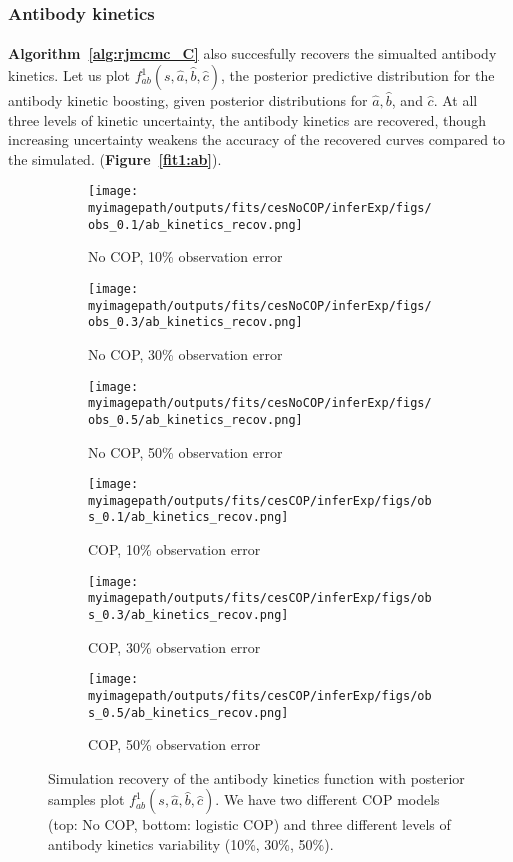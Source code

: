 \subsubsection{Antibody kinetics}
\paragraph{} \textbf{Algorithm~\ref{alg:rjmcmc_C}} also succesfully recovers the simualted antibody kinetics. Let us plot $f^1_{ab}(s, \hat{a}, \hat{b}, \hat{c})$, the posterior predictive distribution for the antibody kinetic boosting, given posterior distributions for $ \hat{a}, \hat{b}$, and $\hat{c}$. At all three levels of kinetic uncertainty, the antibody kinetics are recovered, though increasing uncertainty weakens the accuracy of the recovered curves compared to the simulated. (\textbf{Figure~\ref{fit1:ab}}).

\begin{figure}[H]
\label{fit2:ab}
    \centering
    \begin{subfigure}{0.31\textwidth}
        \centering
        \texttt{[image: \\myimagepath/outputs/fits/cesNoCOP/inferExp/figs/obs\_0.1/ab\_kinetics\_recov.png]}
        \caption{No COP, 10\% observation error}
    \end{subfigure}
    \begin{subfigure}{0.31\textwidth}
        \centering
        \texttt{[image: \\myimagepath/outputs/fits/cesNoCOP/inferExp/figs/obs\_0.3/ab\_kinetics\_recov.png]}
        \caption{No COP, 30\% observation error}
    \end{subfigure}
    \begin{subfigure}{0.31\textwidth}
        \centering
        \texttt{[image: \\myimagepath/outputs/fits/cesNoCOP/inferExp/figs/obs\_0.5/ab\_kinetics\_recov.png]}
        \caption{No COP, 50\% observation error}
    \end{subfigure}
    
  \begin{subfigure}{0.31\textwidth}
        \centering
        \texttt{[image: \\myimagepath/outputs/fits/cesCOP/inferExp/figs/obs\_0.1/ab\_kinetics\_recov.png]}
        \caption{ COP, 10\% observation error}
    \end{subfigure}
    \begin{subfigure}{0.31\textwidth}
        \centering
        \texttt{[image: \\myimagepath/outputs/fits/cesCOP/inferExp/figs/obs\_0.3/ab\_kinetics\_recov.png]}
        \caption{ COP, 30\% observation error}
    \end{subfigure}
    \begin{subfigure}{0.31\textwidth}
        \centering
        \texttt{[image: \\myimagepath/outputs/fits/cesCOP/inferExp/figs/obs\_0.5/ab\_kinetics\_recov.png]}
        \caption{ COP, 50\% observation error}
    \end{subfigure}
    
    \caption{Simulation recovery of the antibody kinetics function with posterior samples plot $f^1_{ab}(s, \hat{a}, \hat{b}, \hat{c})$. We have two different COP models (top: No COP, bottom: logistic COP) and three different levels of antibody kinetics variability (10\%, 30\%, 50\%).}
   \end{figure}
